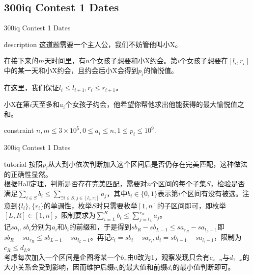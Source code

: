 \documentclass{beamer}
\begin{document}
\subsection{300iq Contest 1 Dates}
\begin{frame}{300iq Contest 1 Dates}
	\begin{block}{description}
		这道题需要一个主人公，我们不妨管他叫小X。
		
		在接下来的$m$天时间里，有$n$个女孩子想要和小X约会。第$i$个女孩子想要在$[l_i,r_i]$中的某一天和小X约会，且约会后小X会得到$p_i$的愉悦值。
		
		在这里，我们保证$l_i\le l_{i+1}, r_i \le r_{i+1}$。
		
		小X在第$i$天至多和$a_i$个女孩子约会，他希望你帮他求出他能获得的最大愉悦值之和。
	\end{block}
	\begin{block}{constraint}
		$n, m \le 3\times 10^5, 0 \le a_i \le n, 1 \le p_i \le 10^9.$
	\end{block}
\end{frame}
\begin{frame}{300iq Contest 1 Dates}
	\begin{block}{tutorial}
		按照$p_i$从大到小依次判断加入这个区间后是否仍存在完美匹配，这种做法的正确性显然。\\
		
		根据Hall定理，判断是否存在完美匹配，需要对$n$个区间的每个子集$S$，检验是否满足$\sum_{i \in S}b_i \le \sum_{\exists i \in S, j \in [l_i, r_i]}a_j$，其中$b_i \in \{0, 1\}$表示第$i$个区间有没有被选。注意到$\{l_i\}, \{r_i\}$的单调性，枚举$S$时只需要枚举$[1, n]$的子区间即可，即枚举$[L, R] \in [1, n]$，限制要求为$\sum_{i=L}^{R}b_i \le \sum_{j=l_L}^{r_R}a_j$。\\
		
		记$sa_i,sb_i$分别为$a_i$和$b_i$的前缀和，于是得到$sb_R-sb_{L-1}\le sa_{r_R}-sa_{l_L-1}$即$sb_R-sa_{r_R}\le sb_{L-1}-sa_{l_L-1}$。再记$c_i=sb_i-sa_{r_i},d_i=sb_{i-1}-sa_{l_i-1}$，限制为$c_R\le d_L$。\\
		
		考虑每次加入一个区间是企图将某一个$b_x$由$0$改为$1$，观察发现只会有$c_{x...n}$与$d_{1...x}$的大小关系会受到影响，因而维护后缀$c_i$的最大值和前缀$d_i$的最小值判断即可。
	\end{block}
\end{frame}
\fi
\end{document}
